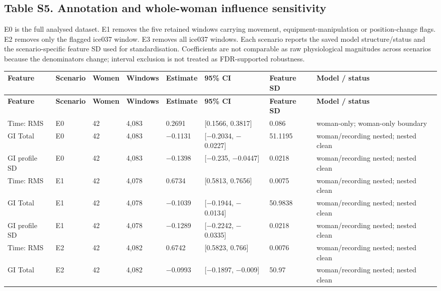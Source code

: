 \documentclass[10pt]{article}
\begin{document}
\clearpage
\begin{landscape}
\section*{Table S5. Annotation and whole-woman influence sensitivity}\label{tab:s5_sensitivity}
E0 is the full analysed dataset. E1 removes the five retained windows carrying movement, equipment-manipulation or position-change flags. E2 removes only the flagged ice037 window. E3 removes all ice037 windows. Each scenario reports the saved model structure/status and the scenario-specific feature SD used for standardisation. Coefficients are not comparable as raw physiological magnitudes across scenarios because the denominators change; interval exclusion is not treated as FDR-supported robustness.
\begin{longtable}{p{3.3cm}p{1.5cm}p{1.2cm}p{1.4cm}p{1.5cm}p{3.0cm}p{1.5cm}p{4.0cm}}
\toprule
\textbf{Feature} & \textbf{Scenario} & \textbf{Women} & \textbf{Windows} & \textbf{Estimate} & \textbf{95\% CI} & \textbf{Feature SD} & \textbf{Model / status} \\
\midrule
\endfirsthead
\toprule
\textbf{Feature} & \textbf{Scenario} & \textbf{Women} & \textbf{Windows} & \textbf{Estimate} & \textbf{95\% CI} & \textbf{Feature SD} & \textbf{Model / status} \\
\midrule
\endhead
Time: RMS & E0 & 42 & 4,083 & 0.2691 & [0.1566, 0.3817] & 0.086 & woman-only; woman-only boundary \\
GI Total & E0 & 42 & 4,083 & $-$0.1131 & [$-$0.2034, $-$0.0227] & 51.1195 & woman/recording nested; nested clean \\
GI profile SD & E0 & 42 & 4,083 & $-$0.1398 & [$-$0.235, $-$0.0447] & 0.0218 & woman/recording nested; nested clean \\
Time: RMS & E1 & 42 & 4,078 & 0.6734 & [0.5813, 0.7656] & 0.0075 & woman/recording nested; nested clean \\
GI Total & E1 & 42 & 4,078 & $-$0.1039 & [$-$0.1944, $-$0.0134] & 50.9838 & woman/recording nested; nested clean \\
GI profile SD & E1 & 42 & 4,078 & $-$0.1289 & [$-$0.2242, $-$0.0335] & 0.0218 & woman/recording nested; nested clean \\
Time: RMS & E2 & 42 & 4,082 & 0.6742 & [0.5823, 0.766] & 0.0076 & woman/recording nested; nested clean \\
GI Total & E2 & 42 & 4,082 & $-$0.0993 & [$-$0.1897, $-$0.009] & 50.97 & woman/recording nested; nested clean \\

\end{longtable}
\end{landscape}
\end{document}
